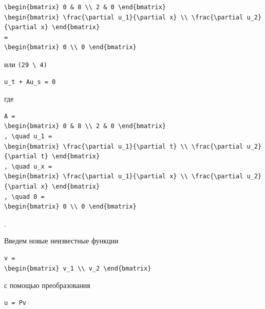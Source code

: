\documentclass[
  ukrainian,
]{article}
\begin{document}
\begin{verbatim}
\begin{bmatrix} 0 & 8 \\ 2 & 0 \end{bmatrix}
\begin{bmatrix} \frac{\partial u_1}{\partial x} \\ \frac{\partial u_2}{\partial x} \end{bmatrix}
=
\begin{bmatrix} 0 \\ 0 \end{bmatrix}
\end{verbatim}

или \texttt{(29\ \textbackslash{}\ 4)}

\begin{verbatim}
u_t + Au_s = 0
\end{verbatim}

где

\begin{verbatim}
A =
\begin{bmatrix} 0 & 8 \\ 2 & 0 \end{bmatrix}
, \quad u_1 =
\begin{bmatrix} \frac{\partial u_1}{\partial t} \\ \frac{\partial u_2}{\partial t} \end{bmatrix}
, \quad u_x =
\begin{bmatrix} \frac{\partial u_1}{\partial x} \\ \frac{\partial u_2}{\partial x} \end{bmatrix}
, \quad 0 =
\begin{bmatrix} 0 \\ 0 \end{bmatrix}
\end{verbatim}

.

Введем новые неизвестные функции

\begin{verbatim}
v =
\begin{bmatrix} v_1 \\ v_2 \end{bmatrix}
\end{verbatim}

с помощью преобразования

\begin{verbatim}
u = Pv
\end{verbatim}
\end{document}
